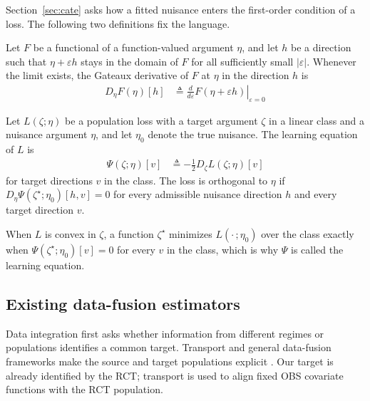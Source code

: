 Section~\ref{sec:cate} asks how a fitted nuisance enters the first-order condition of a loss. The following two definitions fix the language.
\begin{definition}
\label{def:gateaux}
Let $F$ be a functional of a function-valued argument $\eta$, and let $h$ be a direction such that $\eta+\varepsilon h$ stays in the domain of $F$ for all sufficiently small $|\varepsilon|$. Whenever the limit exists, the Gateaux derivative of $F$ at $\eta$ in the direction $h$ is
\begin{align}
	D_\eta F(\eta)[h]&\triangleq\left.\frac{d}{d\varepsilon}F(\eta+\varepsilon h)\right|_{\varepsilon=0}
	\label{eq:gateaux-derivative}
\end{align}
\end{definition}
\begin{definition}
\label{def:orthogonality}
Let $L(\zeta;\eta)$ be a population loss with a target argument $\zeta$ in a linear class and a nuisance argument $\eta$, and let $\eta_0$ denote the true nuisance. The learning equation of $L$ is
\begin{align}
\Psi(\zeta;\eta)[v]&\triangleq-\frac12D_\zeta L(\zeta;\eta)[v]
\label{eq:learning-equation-generic}
\end{align}
for target directions $v$ in the class.  The loss is orthogonal to $\eta$ if $D_\eta\Psi(\zeta^\star;\eta_0)[h,v]=0$ for every admissible nuisance direction $h$ and every target direction $v$.
\end{definition}
When $L$ is convex in $\zeta$, a function $\zeta^\star$ minimizes $L(\cdot\,;\eta_0)$ over the class exactly when $\Psi(\zeta^\star;\eta_0)[v]=0$ for every $v$ in the class, which is why $\Psi$ is called the learning equation.

\subsection{Existing data-fusion estimators}
\label{sec:existing-fusion}

Data integration first asks whether information from different regimes or populations identifies a common target. Transport and general data-fusion frameworks make the source and target populations explicit \citep{bareinboim2016fusion,shi2022integration,colnet2020causal}. Our target is already identified by the RCT; transport is used to align fixed OBS covariate functions with the RCT population.

